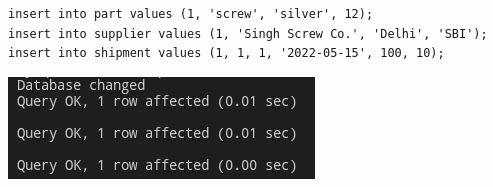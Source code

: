 \documentclass{article}
\begin{document}
\section{}
\begin{lstlisting}
insert into part values (1, 'screw', 'silver', 12);
insert into supplier values (1, 'Singh Screw Co.', 'Delhi', 'SBI');
insert into shipment values (1, 1, 1, '2022-05-15', 100, 10);
\end{lstlisting}
\begin{center}
    \includegraphics[scale=0.6]{3.png}
\end{center}
\end{document}

